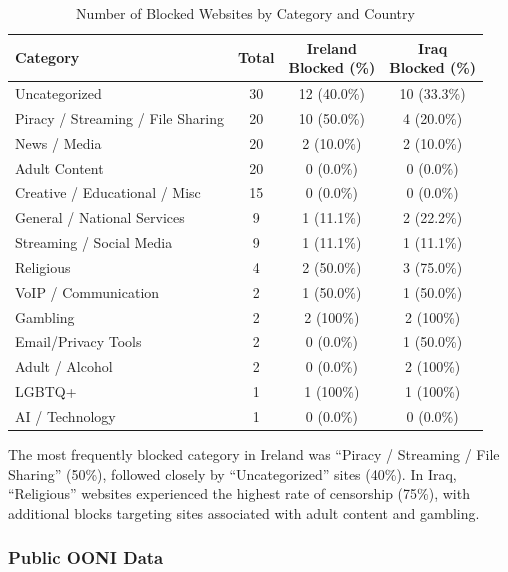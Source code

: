 \begin{table}[H] 
\centering 
\caption{Number of Blocked Websites by Category and Country} 
\begin{tabular}{lccc} 
\toprule 
\textbf{Category} & \textbf{Total} & \shortstack{\textbf{Ireland} \\ \textbf{Blocked (\%)}} & \shortstack{\textbf{Iraq} \\ \textbf{Blocked (\%)}} \\
\midrule 
Uncategorized                      & 30 & 12 (40.0\%)  & 10 (33.3\%) \\
Piracy / Streaming / File Sharing  & 20 & 10 (50.0\%)  & 4 (20.0\%)  \\
News / Media                       & 20 & 2 (10.0\%)   & 2 (10.0\%)  \\
Adult Content                      & 20 & 0 (0.0\%)    & 0 (0.0\%)   \\
Creative / Educational / Misc      & 15 & 0 (0.0\%)    & 0 (0.0\%)   \\
General / National Services        & 9  & 1 (11.1\%)   & 2 (22.2\%)  \\
Streaming / Social Media           & 9  & 1 (11.1\%)   & 1 (11.1\%)  \\
Religious                          & 4  & 2 (50.0\%)   & 3 (75.0\%)  \\
VoIP / Communication               & 2  & 1 (50.0\%)   & 1 (50.0\%)  \\
Gambling                           & 2  & 2 (100\%)    & 2 (100\%)   \\
Email/Privacy Tools                & 2  & 0 (0.0\%)    & 1 (50.0\%)  \\
Adult / Alcohol                    & 2  & 0 (0.0\%)    & 2 (100\%)   \\
LGBTQ+                             & 1  & 1 (100\%)    & 1 (100\%)   \\
AI / Technology                    & 1  & 0 (0.0\%)    & 0 (0.0\%)   \\
\bottomrule 
\end{tabular} 
\label{tab:category_block} 
\end{table}

The most frequently blocked category in Ireland was “Piracy / Streaming / File Sharing” (50\%), followed closely by “Uncategorized” sites (40\%). In Iraq, “Religious” websites experienced the highest rate of censorship (75\%), with additional blocks targeting sites associated with adult content and gambling.

\subsubsection{Public OONI Data}

